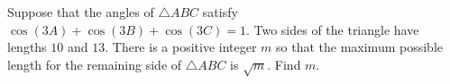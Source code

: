 Suppose that the angles of $\triangle ABC$ satisfy $\cos(3A) + \cos(3B) + \cos(3C) = 1$. Two sides of the triangle have lengths $10$ and $13$. There is a positive integer $m$ so that the maximum possible length for the remaining side of $\triangle ABC$ is $\sqrt{m}$. Find $m$.